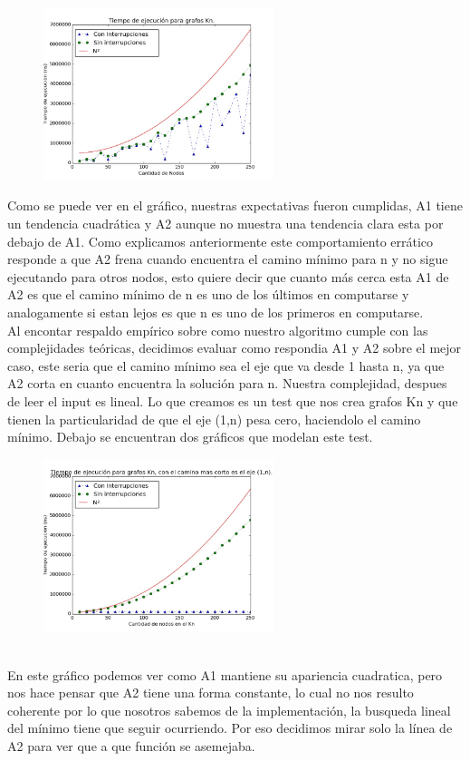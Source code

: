 \documentclass[spanish,12pt]{article}
\begin{document}
\begin{figure}[H]
\centering
\includegraphics[width=0.6\textwidth]{KnC100r3000}
\caption{}
\end{figure}

Como se puede ver en el gráfico, nuestras expectativas fueron cumplidas, A1 tiene un tendencia cuadrática y A2 aunque no muestra una tendencia clara esta por debajo de A1. Como explicamos anteriormente este comportamiento errático responde a que A2 frena cuando encuentra el camino mínimo para n y no sigue ejecutando para otros nodos, esto quiere decir que cuanto más cerca esta A1 de A2 es que el camino mínimo de n es uno de los últimos en computarse y analogamente si estan lejos es que n es uno de los primeros en computarse.
\\
Al encontar respaldo empírico sobre como nuestro algoritmo cumple con las complejidades teóricas, decidimos evaluar como respondia A1 y A2 sobre el mejor caso, este seria que el camino mínimo sea el eje que va desde 1 hasta n, ya que A2 corta en cuanto encuentra la solución para n. Nuestra complejidad, despues de leer el input es lineal. Lo que creamos es un test que nos crea grafos Kn y que tienen la particularidad de que el eje (1,n) pesa cero, haciendolo el camino mínimo. Debajo se encuentran dos gráficos que modelan este test.

\begin{figure}[H]
\centering
\includegraphics[width=0.6\textwidth]{KnOptC150r3000}
\caption{}
\end{figure}
\\
En este gráfico podemos ver como A1 mantiene su apariencia cuadratica, pero nos hace pensar que A2 tiene una forma constante, lo cual no nos resulto coherente  por lo que nosotros sabemos de la implementación, la busqueda lineal del mínimo tiene que seguir ocurriendo. Por eso decidimos mirar solo la línea de A2 para ver que a que función se asemejaba.
\end{document}
